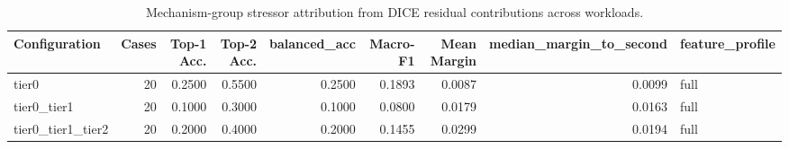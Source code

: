 \begin{table}[t]
\centering
\caption{Mechanism-group stressor attribution from DICE residual contributions across workloads.}
\label{tab:dice_stressor_diagnosis}
\footnotesize
\begin{tabular}{lrrrrrrrl}
\toprule
Configuration & Cases & Top-1 Acc. & Top-2 Acc. & balanced_acc & Macro-F1 & Mean Margin & median_margin_to_second & feature_profile \\
\midrule
tier0 & 20 & 0.2500 & 0.5500 & 0.2500 & 0.1893 & 0.0087 & 0.0099 & full \\
tier0_tier1 & 20 & 0.1000 & 0.3000 & 0.1000 & 0.0800 & 0.0179 & 0.0163 & full \\
tier0_tier1_tier2 & 20 & 0.2000 & 0.4000 & 0.2000 & 0.1455 & 0.0299 & 0.0194 & full \\
\bottomrule
\end{tabular}

\end{table}
